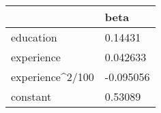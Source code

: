 \begin{tabular}{ll}
& beta \\ 
\hline 
education & 0.14431 \\ 
experience & 0.042633 \\ 
experience\^{}2/100 & -0.095056 \\ 
constant & 0.53089 \\ 
\hline 
\end{tabular}